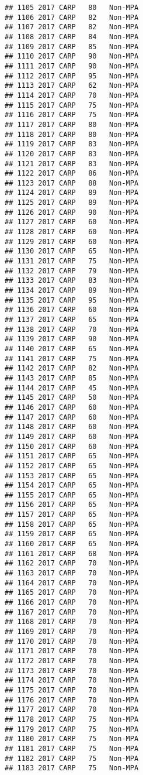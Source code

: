 \documentclass[]{article}
\begin{document}
\begin{verbatim}
## 1105 2017 CARP   80   Non-MPA
## 1106 2017 CARP   82   Non-MPA
## 1107 2017 CARP   82   Non-MPA
## 1108 2017 CARP   84   Non-MPA
## 1109 2017 CARP   85   Non-MPA
## 1110 2017 CARP   90   Non-MPA
## 1111 2017 CARP   90   Non-MPA
## 1112 2017 CARP   95   Non-MPA
## 1113 2017 CARP   62   Non-MPA
## 1114 2017 CARP   70   Non-MPA
## 1115 2017 CARP   75   Non-MPA
## 1116 2017 CARP   75   Non-MPA
## 1117 2017 CARP   80   Non-MPA
## 1118 2017 CARP   80   Non-MPA
## 1119 2017 CARP   83   Non-MPA
## 1120 2017 CARP   83   Non-MPA
## 1121 2017 CARP   83   Non-MPA
## 1122 2017 CARP   86   Non-MPA
## 1123 2017 CARP   88   Non-MPA
## 1124 2017 CARP   89   Non-MPA
## 1125 2017 CARP   89   Non-MPA
## 1126 2017 CARP   90   Non-MPA
## 1127 2017 CARP   60   Non-MPA
## 1128 2017 CARP   60   Non-MPA
## 1129 2017 CARP   60   Non-MPA
## 1130 2017 CARP   65   Non-MPA
## 1131 2017 CARP   75   Non-MPA
## 1132 2017 CARP   79   Non-MPA
## 1133 2017 CARP   83   Non-MPA
## 1134 2017 CARP   89   Non-MPA
## 1135 2017 CARP   95   Non-MPA
## 1136 2017 CARP   60   Non-MPA
## 1137 2017 CARP   65   Non-MPA
## 1138 2017 CARP   70   Non-MPA
## 1139 2017 CARP   90   Non-MPA
## 1140 2017 CARP   65   Non-MPA
## 1141 2017 CARP   75   Non-MPA
## 1142 2017 CARP   82   Non-MPA
## 1143 2017 CARP   85   Non-MPA
## 1144 2017 CARP   45   Non-MPA
## 1145 2017 CARP   50   Non-MPA
## 1146 2017 CARP   60   Non-MPA
## 1147 2017 CARP   60   Non-MPA
## 1148 2017 CARP   60   Non-MPA
## 1149 2017 CARP   60   Non-MPA
## 1150 2017 CARP   60   Non-MPA
## 1151 2017 CARP   65   Non-MPA
## 1152 2017 CARP   65   Non-MPA
## 1153 2017 CARP   65   Non-MPA
## 1154 2017 CARP   65   Non-MPA
## 1155 2017 CARP   65   Non-MPA
## 1156 2017 CARP   65   Non-MPA
## 1157 2017 CARP   65   Non-MPA
## 1158 2017 CARP   65   Non-MPA
## 1159 2017 CARP   65   Non-MPA
## 1160 2017 CARP   65   Non-MPA
## 1161 2017 CARP   68   Non-MPA
## 1162 2017 CARP   70   Non-MPA
## 1163 2017 CARP   70   Non-MPA
## 1164 2017 CARP   70   Non-MPA
## 1165 2017 CARP   70   Non-MPA
## 1166 2017 CARP   70   Non-MPA
## 1167 2017 CARP   70   Non-MPA
## 1168 2017 CARP   70   Non-MPA
## 1169 2017 CARP   70   Non-MPA
## 1170 2017 CARP   70   Non-MPA
## 1171 2017 CARP   70   Non-MPA
## 1172 2017 CARP   70   Non-MPA
## 1173 2017 CARP   70   Non-MPA
## 1174 2017 CARP   70   Non-MPA
## 1175 2017 CARP   70   Non-MPA
## 1176 2017 CARP   70   Non-MPA
## 1177 2017 CARP   70   Non-MPA
## 1178 2017 CARP   75   Non-MPA
## 1179 2017 CARP   75   Non-MPA
## 1180 2017 CARP   75   Non-MPA
## 1181 2017 CARP   75   Non-MPA
## 1182 2017 CARP   75   Non-MPA
## 1183 2017 CARP   75   Non-MPA

\end{verbatim}
\end{document}
